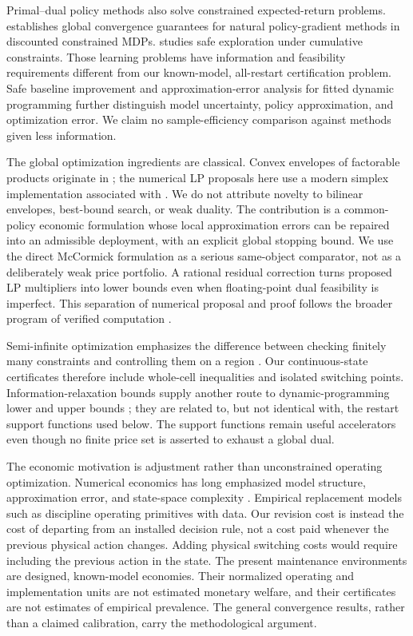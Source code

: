 Primal--dual policy methods also solve constrained expected-return problems. \citet{DingEtAl2020} establishes global convergence guarantees for natural policy-gradient methods in discounted constrained MDPs. \citet{NiKamgarpour2025} studies safe exploration under cumulative constraints. Those learning problems have information and feasibility requirements different from our known-model, all-restart certification problem. Safe baseline improvement \citep{Laroche2019} and approximation-error analysis for fitted dynamic programming \citep{MunosSzepesvari2008,Scherrer2013} further distinguish model uncertainty, policy approximation, and optimization error. We claim no sample-efficiency comparison against methods given less information.

The global optimization ingredients are classical. Convex envelopes of factorable products originate in \citet{McCormick1976}; the numerical LP proposals here use a modern simplex implementation associated with \citet{HuangfuHall2018}. We do not attribute novelty to bilinear envelopes, best-bound search, or weak duality. The contribution is a common-policy economic formulation whose local approximation errors can be repaired into an admissible deployment, with an explicit global stopping bound. We use the direct McCormick formulation as a serious same-object comparator, not as a deliberately weak price portfolio. A rational residual correction turns proposed LP multipliers into lower bounds even when floating-point dual feasibility is imperfect. This separation of numerical proposal and proof follows the broader program of verified computation \citep{Rump2010}.

Semi-infinite optimization emphasizes the difference between checking finitely many constraints and controlling them on a region \citep{HettichKortanek1993}. Our continuous-state certificates therefore include whole-cell inequalities and isolated switching points. Information-relaxation bounds supply another route to dynamic-programming lower and upper bounds \citep{BrownSmithSun2010,BrownSmith2014}; they are related to, but not identical with, the restart support functions used below. The support functions remain useful accelerators even though no finite price set is asserted to exhaust a global dual.

The economic motivation is adjustment rather than unconstrained operating optimization. Numerical economics has long emphasized model structure, approximation error, and state-space complexity \citep{Judd1998,BrummScheidegger2017}. Empirical replacement models such as \citet{Rust1987} discipline operating primitives with data. Our revision cost is instead the cost of departing from an installed decision rule, not a cost paid whenever the previous physical action changes. Adding physical switching costs would require including the previous action in the state. The present maintenance environments are designed, known-model economies. Their normalized operating and implementation units are not estimated monetary welfare, and their certificates are not estimates of empirical prevalence. The general convergence results, rather than a claimed calibration, carry the methodological argument.

